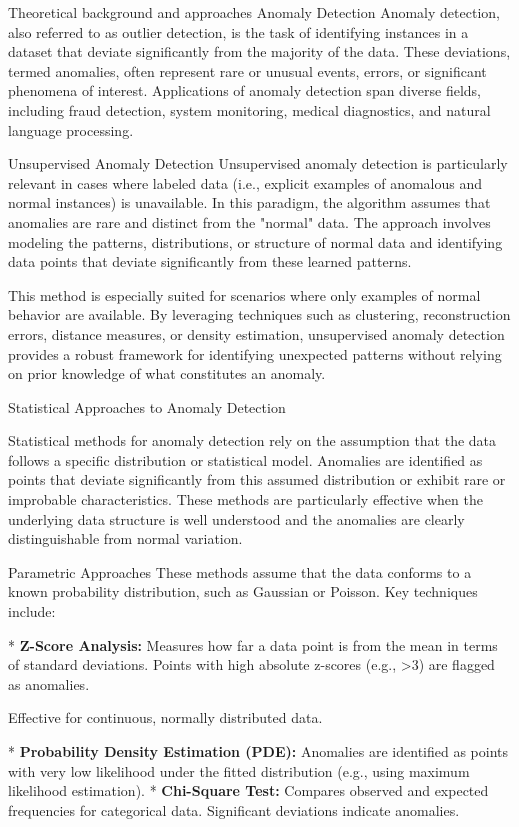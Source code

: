 \chap Theoretical background and approaches
\sec Anomaly Detection
Anomaly detection, also referred to as outlier detection, is the task of identifying instances in a dataset that deviate significantly from the majority of the data. These deviations, termed anomalies, often represent rare or unusual events, errors, or significant phenomena of interest. Applications of anomaly detection span diverse fields, including fraud detection, system monitoring, medical diagnostics, and natural language processing.

\secc Unsupervised Anomaly Detection
Unsupervised anomaly detection is particularly relevant in cases where labeled data (i.e., explicit examples of anomalous and normal instances) is unavailable. In this paradigm, the algorithm assumes that anomalies are rare and distinct from the "normal" data. The approach involves modeling the patterns, distributions, or structure of normal data and identifying data points that deviate significantly from these learned patterns.

This method is especially suited for scenarios where only examples of normal behavior are available. By leveraging techniques such as clustering, reconstruction errors, distance measures, or density estimation, unsupervised anomaly detection provides a robust framework for identifying unexpected patterns without relying on prior knowledge of what constitutes an anomaly.

\sec Statistical Approaches to Anomaly Detection

Statistical methods for anomaly detection rely on the assumption that the data follows a specific distribution or statistical model. Anomalies are identified as points that deviate significantly from this assumed distribution or exhibit rare or improbable characteristics. These methods are particularly effective when the underlying data structure is well understood and the anomalies are clearly distinguishable from normal variation.

\secc Parametric Approaches
These methods assume that the data conforms to a known probability distribution, such as Gaussian or Poisson. Key techniques include:

\begitems
* {\bf Z-Score Analysis:}\nl
Measures how far a data point is from the mean in terms of standard deviations. Points with high absolute z-scores (e.g., >3) are flagged as anomalies.


Effective for continuous, normally distributed data.

* {\bf Probability Density Estimation (PDE):}\nl
Anomalies are identified as points with very low likelihood under the fitted distribution (e.g., using maximum likelihood estimation).
* {\bf Chi-Square Test:}\nl
Compares observed and expected frequencies for categorical data. Significant deviations indicate anomalies.
\enditems


